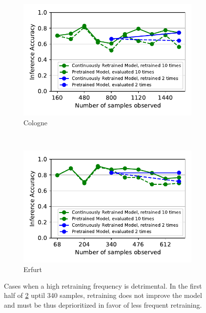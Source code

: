 \begin{figure}[t]
  \centering
  \begin{subfigure}[t]{0.5\linewidth}
    \centering
    \includegraphics[width=\linewidth]{figures/motivation/incr_learn_tasksize/motivation_tasksize_cologne.pdf}
    \caption{Cologne}
    \label{fig:cologne-motivation}
  \end{subfigure}  
  ~~
  \begin{subfigure}[t]{0.5\linewidth}
    \centering
    \includegraphics[width=\linewidth]{figures/motivation/incr_learn_tasksize/motivation_tasksize_erfurt.pdf}
    \caption{Erfurt}
    \label{fig:erfurt-motivation}
  \end{subfigure}
  \caption{Cases when a high retraining frequency is detrimental. In the first half of \ref{fig:erfurt-motivation} uptil 340 samples, retraining does not improve the model and must be thus deprioritized in favor of less frequent retraining. }
  \label{fig:cityscapes-frequency-motivation}
\end{figure}

